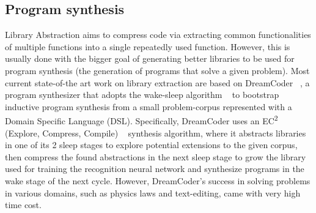 




\subsection{Program synthesis}
Library Abstraction aims to compress code via extracting common functionalities of multiple functions into a single repeatedly used function. However, this is usually done with the bigger goal of generating better libraries to be used for program synthesis (the generation of programs that solve a given problem). Most current state-of-the art work on library extraction are based on DreamCoder ~\cite{ellis2020dreamcoder}, a program synthesizer that adopts the wake-sleep algorithm ~\cite{wake-sleep} to bootstrap inductive program synthesis from a small problem-corpus represented with a Domain Specific Language (DSL). Specifically, DreamCoder uses an EC\textsuperscript{2} (Explore, Compress, Compile) ~\cite{EC2} synthesis algorithm, where it abstracts libraries in one of its 2 sleep stages to explore potential extensions to the given corpus, then compress the found abstractions in the next sleep stage to grow the library used for training the recognition neural network and synthesize programs in the wake stage of the next cycle. However, DreamCoder's success in solving problems in various domains, such as physics laws and text-editing, came with very high time cost. 

